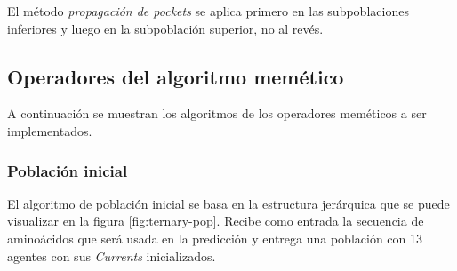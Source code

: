 El método \textit{propagación de pockets} se aplica primero en las subpoblaciones inferiores y luego en la subpoblación superior, no al revés.

\subsection{Operadores del algoritmo mem\'etico}
A continuación se muestran los algoritmos de los operadores meméticos a ser implementados.

\subsubsection{Población inicial}

El algoritmo de población inicial se basa en la estructura jerárquica que se puede visualizar en la figura \ref{fig:ternary-pop}. Recibe como entrada la secuencia de aminoácidos que será usada en la predicción y entrega una población con 13 agentes con sus \textit{Currents} inicializados. 

